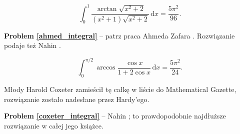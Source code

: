 \begin{problem_with_solution}
    \label{ahmed_integral}%
    \begin{equation}
        \int_0^1 \frac{\arctan \sqrt{x^2+2}}{(x^2+1) \sqrt{x^2+2}} \,\mathrm{d}x = \frac{5\pi^2}{96}.
    \end{equation}
\end{problem_with_solution}

\textbf{Problem \ref{ahmed_integral}} -- patrz praca Ahmeda Zafara \cite{ahmed02}.
Rozwiązanie podaje też Nahin \cite[s. 190-194]{nahin15}.

\begin{problem_with_solution}
    \label{coxeter_integral}%
    \begin{equation}
        \int_0^{\pi/2} \arccos \frac{\cos x}{1 + 2\cos x}  \,\mathrm{d}x = \frac{5\pi^2}{24}.
    \end{equation}
\end{problem_with_solution}

Młody Harold Coxeter zamieścił tę całkę w liście do Mathematical Gazette, rozwiązanie zostało nadesłane przez Hardy'ego.

\textbf{Problem \ref{coxeter_integral}} -- Nahin \cite[s. 190-201]{nahin15}; to prawdopodobnie najdłuższe rozwiązanie w całej jego książce.




%